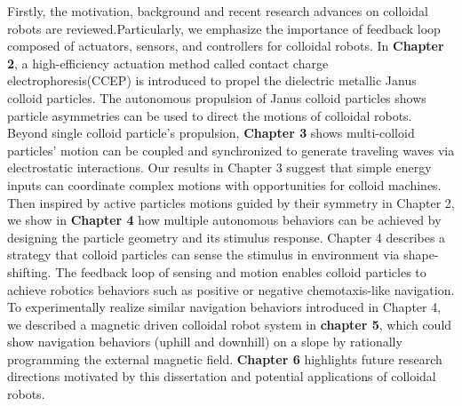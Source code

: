 \begin{titlepage}
Firstly, the motivation, background and recent research  advances on colloidal robots are reviewed.Particularly, we emphasize the importance of feedback
loop composed of actuators, sensors, and controllers for colloidal robots.  In \textbf{Chapter 2},  a high-efficiency actuation method called contact charge electrophoresis(CCEP) is introduced to propel the dielectric metallic Janus colloid particles.  The autonomous propulsion of Janus colloid particles shows particle asymmetries can be used to direct the motions of colloidal robots. Beyond single colloid particle's propulsion, \textbf{Chapter 3} shows multi-colloid particles' motion can be coupled and synchronized to generate  traveling waves via electrostatic interactions.   Our results in Chapter 3 suggest that simple energy inputs can coordinate complex motions with opportunities for colloid machines.  Then inspired by active particles motions guided by their symmetry in Chapter 2, we show in \textbf{Chapter 4} how multiple autonomous behaviors can be achieved by designing the particle geometry and its stimulus response. Chapter 4 describes a strategy that colloid particles can sense the stimulus in environment via shape-shifting. The feedback loop of sensing and motion enables colloid particles to achieve robotics behaviors such as positive or negative chemotaxis-like navigation. To experimentally realize similar navigation behaviors introduced in Chapter 4,  we described a magnetic driven colloidal robot system in \textbf{chapter 5}, which could show navigation behaviors (uphill and downhill) on a slope by rationally  programming the external magnetic field. \textbf{Chapter 6} highlights future research  directions motivated by this dissertation and potential applications of colloidal robots.

\vspace*{\fill}
\end{titlepage}

